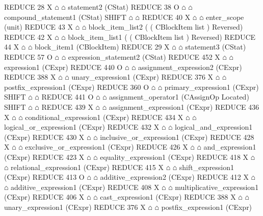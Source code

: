 \begin{isabellebody}
\begin{isamarkuptext}
\begin{isar}
           REDUCE 28 X $\house$ $\house$ statement2  (CStat) 
            REDUCE 38 O $\house$ $\house$ compound_statement1  (CStat) 
             SHIFT $\house$ $\house$ 
             REDUCE 40 X $\house$ $\house$ enter_scope  (unit) 
             REDUCE 43 X $\house$ $\house$ block_item_list2  ( ( CBlockItem list )  Reversed) 
              REDUCE 42 X $\house$ $\house$ block_item_list1  ( ( CBlockItem list )  Reversed) 
              REDUCE 44 X $\house$ $\house$ block_item1  (CBlockItem) 
               REDUCE 29 X $\house$ $\house$ statement3  (CStat) 
                REDUCE 57 O $\house$ $\house$ expression_statement2  (CStat) 
                 REDUCE 452 X $\house$ $\house$ expression1  (CExpr) 
                  REDUCE 440 O $\house$ $\house$ assignment_expression2  (CExpr) 
                   REDUCE 388 X $\house$ $\house$ unary_expression1  (CExpr) 
                    REDUCE 376 X $\house$ $\house$ postfix_expression1  (CExpr) 
                     REDUCE 360 O $\house$ $\house$ primary_expression1  (CExpr) 
                      SHIFT $\house$ $\house$ 
                   REDUCE 441 O $\house$ $\house$ assignment_operator1  (CAssignOp Located) 
                    SHIFT $\house$ $\house$ 
                   REDUCE 439 X $\house$ $\house$ assignment_expression1  (CExpr) 
                    REDUCE 436 X $\house$ $\house$ conditional_expression1  (CExpr) 
                     REDUCE 434 X $\house$ $\house$ logical_or_expression1  (CExpr) 
                      REDUCE 432 X $\house$ $\house$ logical_and_expression1  (CExpr) 
                       REDUCE 430 X $\house$ $\house$ inclusive_or_expression1  (CExpr) 
                        REDUCE 428 X $\house$ $\house$ exclusive_or_expression1  (CExpr) 
                         REDUCE 426 X $\house$ $\house$ and_expression1  (CExpr) 
                          REDUCE 423 X $\house$ $\house$ equality_expression1  (CExpr) 
                           REDUCE 418 X $\house$ $\house$ relational_expression1  (CExpr) 
                            REDUCE 415 X $\house$ $\house$ shift_expression1  (CExpr) 
                             REDUCE 413 O $\house$ $\house$ additive_expression2  (CExpr) 
                              REDUCE 412 X $\house$ $\house$ additive_expression1  (CExpr) 
                               REDUCE 408 X $\house$ $\house$ multiplicative_expression1  (CExpr) 
                                REDUCE 406 X $\house$ $\house$ cast_expression1  (CExpr) 
                                 REDUCE 388 X $\house$ $\house$ unary_expression1  (CExpr) 
                                  REDUCE 376 X $\house$ $\house$ postfix_expression1  (CExpr) 

\end{isar}
\end{isamarkuptext}
\end{isabellebody}
